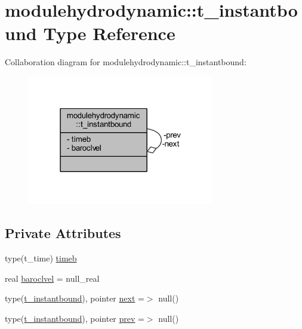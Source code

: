 \hypertarget{structmodulehydrodynamic_1_1t__instantbound}{}\section{modulehydrodynamic\+:\+:t\+\_\+instantbound Type Reference}
\label{structmodulehydrodynamic_1_1t__instantbound}


Collaboration diagram for modulehydrodynamic\+:\+:t\+\_\+instantbound\+:\nopagebreak
\begin{figure}[H]
\begin{center}
\leavevmode
\includegraphics[width=231pt]{structmodulehydrodynamic_1_1t__instantbound__coll__graph}
\end{center}
\end{figure}
\subsection*{Private Attributes}
\begin{DoxyCompactItemize}
\item 
type(t\+\_\+time) \mbox{\hyperlink{structmodulehydrodynamic_1_1t__instantbound_a513e78c597b93d440e08977b19abd195}{timeb}}
\item 
real \mbox{\hyperlink{structmodulehydrodynamic_1_1t__instantbound_a435431aaff1a8984d199fa9ce38df4f3}{baroclvel}} = null\+\_\+real
\item 
type(\mbox{\hyperlink{structmodulehydrodynamic_1_1t__instantbound}{t\+\_\+instantbound}}), pointer \mbox{\hyperlink{structmodulehydrodynamic_1_1t__instantbound_a584964f709b1201b759caae8c4594b3b}{next}} =$>$ null()
\item 
type(\mbox{\hyperlink{structmodulehydrodynamic_1_1t__instantbound}{t\+\_\+instantbound}}), pointer \mbox{\hyperlink{structmodulehydrodynamic_1_1t__instantbound_a01245aeeeacfe265c69375b3b8dd3b95}{prev}} =$>$ null()
\end{DoxyCompactItemize}


